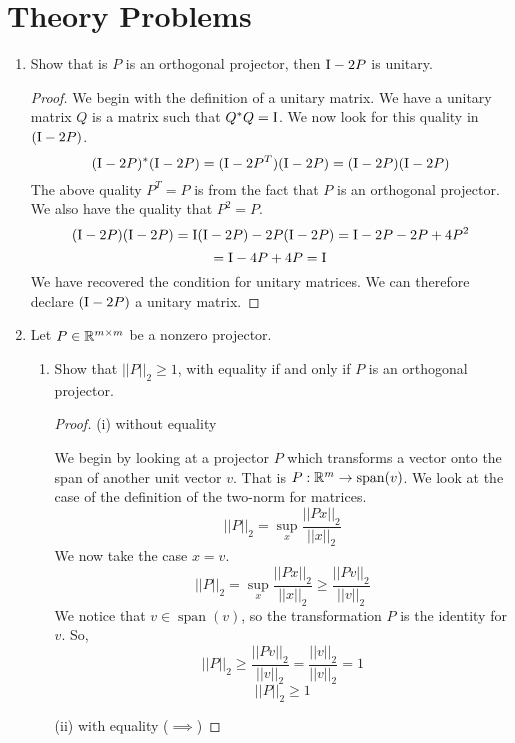 \documentclass{article}
\DeclareMathOperator{\vecspan}{span}
\begin{document}
\section{Theory Problems}
\begin{enumerate}

\item %
Show that is $P$ is an orthogonal projector, then $\mathrm{I} - 2P$ is unitary. 

\begin{proof}
    We begin with the definition of a unitary matrix. We have a unitary matrix $Q$ is a matrix such that $Q^*Q = \mathrm{I}$. We now look for this quality in $(\mathrm{I} - 2P)$. 
    \[
        (\mathrm{I} - 2P)^*(\mathrm{I} - 2P) = (\mathrm{I} - 2P^T)(\mathrm{I} - 2P) = (\mathrm{I} - 2P)(\mathrm{I} - 2P)
    \]
    The above quality $P^T = P$ is from the fact that $P$ is an orthogonal projector. We also have the quality that $P^2 = P$.
    \[
        (\mathrm{I} - 2P)(\mathrm{I} - 2P) = \mathrm{I}(\mathrm{I} - 2P) - 2P(\mathrm{I} - 2P) = \mathrm{I} - 2P - 2P + 4P^2
    \]
    \[
        = \mathrm{I} - 4P +4P = \mathrm{I}
    \]  
    We have recovered the condition for unitary matrices. We can therefore declare $(\mathrm{I} - 2P)$ a unitary matrix. 
\end{proof}


\item %
Let $P \in \mathbb{R}^{m \times m}$ be a nonzero projector. 
\begin{enumerate}
    \item Show that $||P||_2 \ge 1$, with equality if and only if $P$ is an orthogonal projector. 
    \begin{proof}
        (i) without equality
        
        We begin by looking at a projector $P$ which transforms a vector onto the span of another unit vector $v$. That is $P: \R^m \to \vecspan(v)$. We look at the case of the definition of the two-norm for matrices. 
        \[
            ||P||_2 = \sup_{x} \frac{||Px||_2}{||x||_2}
        \]
        We now take the case $x = v$. 
        \[
            ||P||_2 = \sup_{x} \frac{||Px||_2}{||x||_2} \ge \frac{||Pv||_2}{||v||_2}
        \]
        We notice that $v \in \vecspan(v)$, so the transformation $P$ is the identity for $v$. So, 
        \[
            ||P||_2 \ge \frac{||Pv||_2}{||v||_2} = \frac{||v||_2}{||v||_2} = 1
        \]
        \[
            ||P||_2 \ge 1
        \]

        (ii) with equality ($\implies$)
    

\end{proof}
\end{enumerate}
\end{enumerate}
\end{document}
